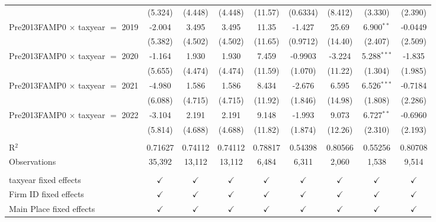 \begin{tabular}{lcccccccc}
                                           & (5.324)       & (4.448)       & (4.448)       & (11.57)       & (0.6334)        & (8.412)       & (3.330)       & (2.390)\\   
   Pre2013FAMP0 $\times$ taxyear $=$ 2019  & -2.004        & 3.495         & 3.495         & 11.35         & -1.427          & 25.69         & 6.900$^{**}$  & -0.0449\\   
                                           & (5.382)       & (4.502)       & (4.502)       & (11.65)       & (0.9712)        & (14.40)       & (2.407)       & (2.509)\\   
   Pre2013FAMP0 $\times$ taxyear $=$ 2020  & -1.164        & 1.930         & 1.930         & 7.459         & -0.9903         & -3.224        & 5.288$^{***}$ & -1.835\\   
                                           & (5.655)       & (4.474)       & (4.474)       & (11.59)       & (1.070)         & (11.22)       & (1.304)       & (1.985)\\   
   Pre2013FAMP0 $\times$ taxyear $=$ 2021  & -4.980        & 1.586         & 1.586         & 8.434         & -2.676          & 6.595         & 6.526$^{***}$ & -0.7184\\   
                                           & (6.088)       & (4.715)       & (4.715)       & (11.92)       & (1.846)         & (14.98)       & (1.808)       & (2.286)\\   
   Pre2013FAMP0 $\times$ taxyear $=$ 2022  & -3.104        & 2.191         & 2.191         & 9.148         & -1.993          & 9.073         & 6.727$^{**}$  & -0.6960\\   
                                           & (5.814)       & (4.688)       & (4.688)       & (11.82)       & (1.874)         & (12.26)       & (2.310)       & (2.193)\\   
    \\
   R$^2$                                   & 0.71627       & 0.74112       & 0.74112       & 0.78817       & 0.54398         & 0.80566       & 0.55256       & 0.80708\\  
   Observations                            & 35,392        & 13,112        & 13,112        & 6,484         & 6,311           & 2,060         & 1,538         & 9,514\\  
    \\
   taxyear fixed effects                   & $\checkmark$  & $\checkmark$  & $\checkmark$  & $\checkmark$  & $\checkmark$    & $\checkmark$  & $\checkmark$  & $\checkmark$\\   
   Firm ID fixed effects                   & $\checkmark$  & $\checkmark$  & $\checkmark$  & $\checkmark$  & $\checkmark$    & $\checkmark$  & $\checkmark$  & $\checkmark$\\   
   Main Place fixed effects                & $\checkmark$  & $\checkmark$  & $\checkmark$  & $\checkmark$  & $\checkmark$    & $\checkmark$  & $\checkmark$  & $\checkmark$\\   
   \bottomrule
\end{tabular}
\par\endgroup
